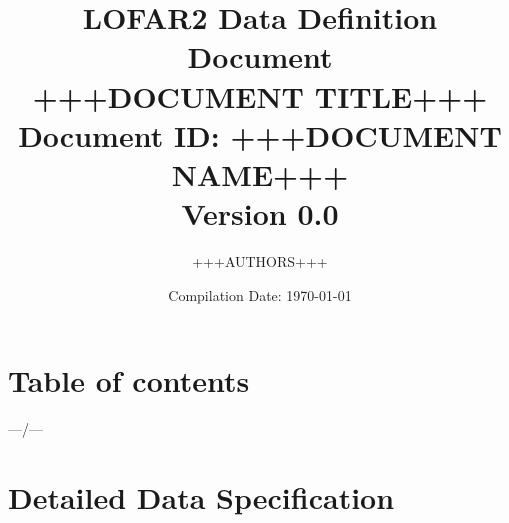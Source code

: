 \documentclass[a4paper,10pt,bibtotoc]{scrartcl}
\begin{document}

\title{LOFAR2 Data Definition Document \\ +++DOCUMENT TITLE+++ \\
{\normalsize Document ID: +++DOCUMENT NAME+++} \\ 
{\normalsize Version 0.0} \\
}
\author{+++AUTHORS+++}
\date{\small{Compilation Date: \today}}
\maketitle

\section{Table of contents}



\clearpage






%

%


---/---

\newpage
\section{Detailed Data Specification}
\end{document}
